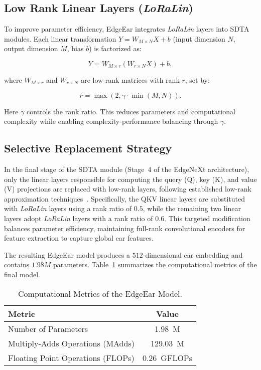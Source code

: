 \documentclass[a4paper, 10pt, conference]{ieeeconf}
\begin{document}
\subsection{Low Rank Linear Layers (\textit{LoRaLin})}

To improve parameter efficiency, EdgeEar integrates \textit{LoRaLin} layers into SDTA modules. Each linear transformation \( Y = W_{M \times N}X + b \) (input dimension \( N \), output dimension \( M \), bias \( b \)) is factorized as:

\begin{equation}
    Y = W_{M \times r}(W_{r \times N}X) + b,
\end{equation}

where \( W_{M \times r} \) and \( W_{r \times N} \) are low-rank matrices with rank \( r \), set by:

\begin{equation}
    r = \max\left(2, \gamma \cdot \min(M, N)\right).
\end{equation}

Here \( \gamma \) controls the rank ratio. This reduces parameters and computational complexity while enabling complexity-performance balancing through \( \gamma \).

\subsection{Selective Replacement Strategy}

In the final stage of the SDTA module (Stage~4 of the EdgeNeXt architecture), only the linear layers responsible for computing the query (Q), key (K), and value (V) projections are replaced with low-rank layers, following established low-rank approximation techniques~\cite{hu2022lora, wang2020linformer}. Specifically, the QKV linear layers are substituted with \textit{LoRaLin} layers using a rank ratio of $0.5$, while the remaining two linear layers adopt \textit{LoRaLin} layers with a rank ratio of $0.6$. This targeted modification balances parameter efficiency, maintaining full-rank convolutional encoders for feature extraction to capture global ear features. 

The resulting EdgeEar model produces a $512$-dimensional ear embedding and contains $1.98M$ parameters. Table~\ref{tab:edgeear_metrics} summarizes the computational metrics of the final model.

\begin{table}[htbp]
    \centering
    \caption{Computational Metrics of the EdgeEar Model.}
    \label{tab:edgeear_metrics}
    \begin{tabular}{@{}lc@{}}
        \toprule
        \textbf{Metric} & \textbf{Value} \\ 
        \midrule
        Number of Parameters                    & \num{1.98}~M \\
        Multiply-Adds Operations (MAdds) & \num{129.03}~M \\
        Floating Point Operations (FLOPs)       & \num{0.26}~GFLOPs \\
        \bottomrule
    \end{tabular}
\end{table}
\end{document}
